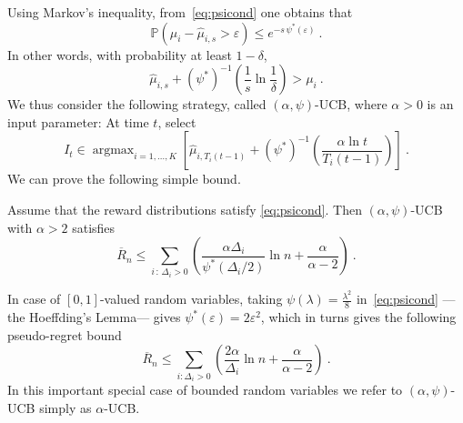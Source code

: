 \documentclass[11pt]{hackednow}
\renewcommand{\P}{\mathbb{P}}
\newcommand{\oR}{\overline{R}}
\renewcommand{\epsilon}{\varepsilon}
\newcommand{\wh}{\widehat}
\newcommand{\argmax}{\mathop{\mathrm{argmax}}}
\begin{document}
Using Markov's inequality, from~\eqref{eq:psicond} one obtains that
\begin{equation} \label{eq:psiconcentration}
\P(\mu_i - \wh{\mu}_{i,s} > \epsilon) \leq e^{- s\,\psi^*(\epsilon)}~.
\end{equation}
In other words, with probability at least $1- \delta$,
$$\wh{\mu}_{i,s} + \left(\psi^*\right)^{-1}\left( \frac{1}{s}\ln\frac{1}{\delta}\right) > \mu_i~.$$
We thus consider the following strategy, called $(\alpha, \psi)$-UCB, where $\alpha >0$ is an input parameter: At time $t$, select
\[
I_t \in \argmax_{i=1,\hdots,K} \left[ \wh{\mu}_{i,T_i(t-1)} + \left(\psi^*\right)^{-1}\left( \frac{\alpha \ln t}{T_i(t-1)}\right) \right]~.
\]
We can prove the following simple bound.
\begin{theorem} \label{th:ucb}
Assume that the reward distributions satisfy \eqref{eq:psicond}. Then $(\alpha, \psi)$-UCB with $\alpha > 2$ satisfies
$$\oR_n \leq \sum_{i \,:\, \Delta_i > 0} \left( \frac{\alpha \Delta_i}{\psi^*(\Delta_i / 2)} \ln n + \frac{\alpha}{\alpha - 2}  \right)~.$$
\end{theorem}
In case of $[0,1]$-valued random variables, taking $\psi(\lambda) = \tfrac{\lambda^2}{8}$ in~\eqref{eq:psicond} ---the Hoeffding's Lemma--- gives $\psi^*(\epsilon) = 2 \epsilon^2$, which in turns gives the following pseudo-regret bound
\begin{equation} \label{eq:regretUCBbounded}
\oR_n \leq \sum_{i : \Delta_i > 0} \left( \frac{2 \alpha}{\Delta_i} \ln n + \frac{\alpha}{\alpha - 2}  \right)~.
\end{equation}
In this important special case of bounded random variables we refer to $(\alpha,\psi)$-UCB simply as $\alpha$-UCB.
\end{document}
